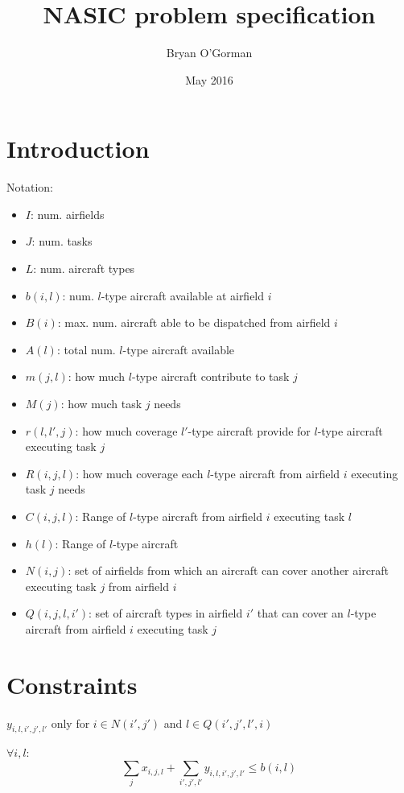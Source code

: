 \documentclass{article}
\title{NASIC problem specification}
\author{Bryan O'Gorman}
\date{May 2016}
\begin{document}
\maketitle

\section{Introduction}
Notation:
\begin{itemize}
    \item $I$: num. airfields
    \item $J$: num. tasks
    \item $L$: num. aircraft types
    \item $b(i, l)$: num. $l$-type aircraft available at airfield $i$
    \item $B(i)$: max. num. aircraft able to be dispatched from airfield $i$
    \item $A(l)$: total num. $l$-type aircraft available
    \item $m(j, l)$: how much $l$-type aircraft contribute to task $j$
    \item $M(j)$: how much task $j$ needs
    \item $r(l, l', j)$: how much coverage $l'$-type aircraft provide for $l$-type aircraft executing task $j$
    \item $R(i, j, l)$: how much coverage each $l$-type aircraft from airfield $i$ executing task $j$ needs
    \item $C(i, j, l)$: Range of $l$-type aircraft from airfield $i$ executing task $l$
    \item $h(l)$: Range of $l$-type aircraft
    \item $N(i, j)$: set of airfields from which an aircraft can cover another aircraft executing task $j$ from airfield $i$  
    \item $Q(i, j, l, i')$: set of aircraft types in airfield $i'$ that can cover an $l$-type aircraft from airfield $i$ executing task $j$
\end{itemize}


\section{Constraints}

$y_{i, l, i', j', l'}$ only for $i \in N(i', j')$ and $l \in Q(i', j', l', i)$

$\forall i, l$: 
\begin{equation}
\sum_j x_{i, j, l} + \sum_{i', j', l'}  y_{i, l, i', j', l'} \leq b(i, l)
\end{equation}
\end{document}
